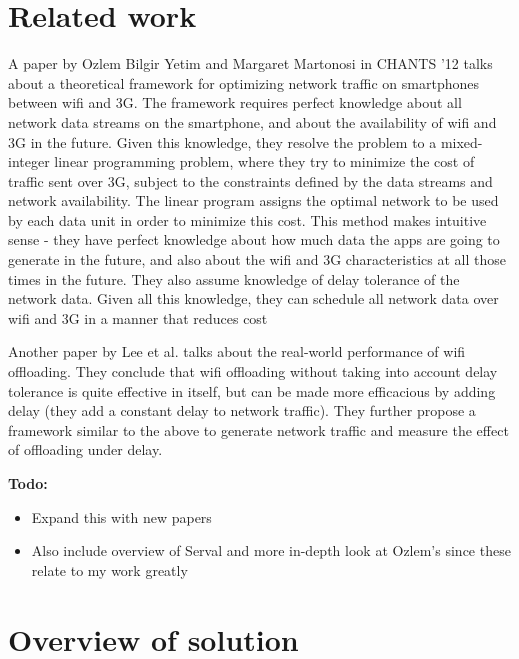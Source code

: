 \documentclass[12pt, fleqn]{article}
\begin{document}

\section{Related work}
\label{related-work}

A paper by Ozlem Bilgir Yetim and Margaret Martonosi in CHANTS '12 talks about a 
theoretical framework for optimizing network traffic on smartphones between wifi 
and 3G. The framework requires perfect knowledge about all network data streams on the
smartphone, and about the availability of wifi and 3G in the future. Given this 
knowledge, they resolve the problem to a mixed-integer linear programming 
problem, where they try to minimize the cost of traffic sent over 3G, subject to 
the constraints defined by the data streams and network availability. The linear program 
assigns the optimal network to be used by each data unit in order to minimize 
this cost.\cite{ozlem-2012} This method makes intuitive sense - they have  
perfect knowledge about how much data the apps are going to generate in the future, and 
also about the wifi and 3G characteristics at all those times in the future. 
They also assume knowledge of delay tolerance of the network data. Given all 
this knowledge, they can schedule all network data over wifi and 3G in a manner 
that reduces cost

Another paper by Lee et al. talks about the real-world performance of wifi 
offloading. They conclude that wifi offloading without taking into account delay 
tolerance is quite effective in itself, but can be made more efficacious by 
adding delay (they add a constant delay to network traffic). They further 
propose a framework similar to the above to generate network traffic and measure 
the effect of offloading under delay.\cite{lee-2012}

\bigskip
\textbf{Todo:}
\begin{itemize}
  \item Expand this with new papers
  \item Also include overview of Serval and more in-depth look at Ozlem's since 
  these relate to my work greatly
\end{itemize}


\section{Overview of solution}
\label{overview}
\end{document}
